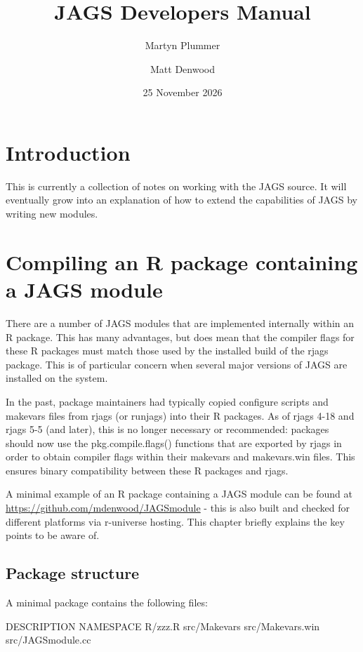 \documentclass[11pt, a4paper, titlepage]{report}
\begin{document}
\title{JAGS Developers Manual}
\author{Martyn Plummer \and Matt Denwood}
\date{25 November 2026}
\maketitle

\tableofcontents

\chapter{Introduction}

This is currently a collection of notes on working with the JAGS
source. It will eventually grow into an explanation of how to extend
the capabilities of JAGS by writing new modules.

\chapter{Compiling an R package containing a JAGS module}

There are a number of JAGS modules that are implemented internally
within an R package. This has many advantages, but does mean that
the compiler flags for these R packages must match those used by
the installed build of the rjags package. This is of particular concern
when several major versions of JAGS are installed on the system.

In the past, package maintainers had typically copied configure scripts
and makevars files from rjags (or runjags) into their R packages. As
of rjags 4-18 and rjags 5-5 (and later), this is no longer necessary
or recommended:  packages should now use the pkg.compile.flags()
functions that are exported by rjags in order to obtain compiler flags
within their makevars and makevars.win files. This ensures binary
compatibility between these R packages and rjags.

A minimal example of an R package containing a JAGS module can
be found at \url{https://github.com/mdenwood/JAGSmodule} - this is
also built and checked for different platforms via r-universe hosting.
This chapter briefly explains the key points to be aware of.

\section{Package structure}

A minimal package contains the following files:

DESCRIPTION
NAMESPACE
R/zzz.R
src/Makevars
src/Makevars.win
src/JAGSmodule.cc
\end{document}
